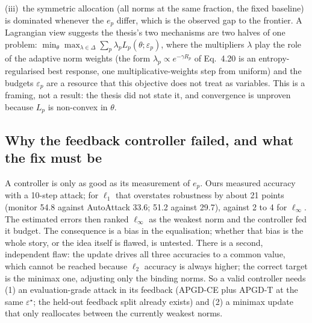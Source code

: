 \documentclass[11pt]{article}
\begin{document}
(iii)~the symmetric allocation (all norms at the same fraction, the fixed baseline) is dominated whenever the $e_p$ differ, which is the observed gap to the frontier.
A Lagrangian view suggests the thesis's two mechanisms are two halves of one problem: $\min_\theta\max_{\lambda\in\Delta}\sum_p\lambda_p L_p(\theta;\varepsilon_p)$, where the multipliers $\lambda$ play the role of the adaptive norm weights (the form $\lambda_p\propto e^{-\gamma R_p}$ of Eq.~4.20 is an entropy-regularised best response, one multiplicative-weights step from uniform) and the budgets $\varepsilon_p$ are a resource that this objective does not treat as variables. This is a framing, not a result: the thesis did not state it, and convergence is unproven because $L_p$ is non-convex in $\theta$.

\subsection{Why the feedback controller failed, and what the fix must be}
A controller is only as good as its measurement of $e_p$. Ours measured accuracy with a 10-step attack; for $\ell_1$ that overstates robustness by about 21 points (monitor 54.8 against AutoAttack 33.6; 51.2 against 29.7), against 2 to 4 for $\ell_\infty$. The estimated errors then ranked $\ell_\infty$ as the weakest norm and the controller fed it budget. The consequence is a bias in the equalisation; whether that bias is the whole story, or the idea itself is flawed, is untested.
There is a second, independent flaw: the update drives all three accuracies to a common value, which cannot be reached because $\ell_2$ accuracy is always higher; the correct target is the minimax one, adjusting only the binding norms. So a valid controller needs (1) an evaluation-grade attack in its feedback (APGD-CE plus APGD-T at the same $\varepsilon^\star$; the held-out feedback split already exists) and (2) a minimax update that only reallocates between the currently weakest norms.
\end{document}
